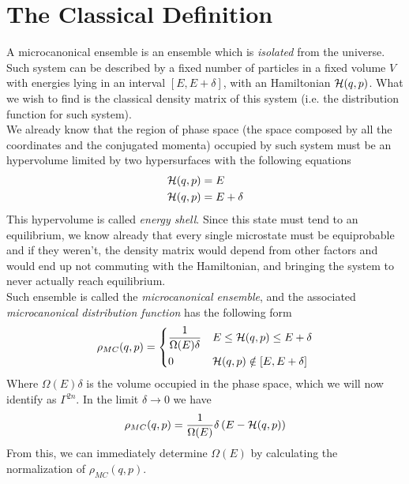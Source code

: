 \documentclass[../qm.tex]{subfiles}
\begin{document}
		\section{The Classical Definition}
		A microcanonical ensemble is an ensemble which is \textit{isolated} from the universe.\\
		Such system can be described by a fixed number of particles in a fixed volume $V$ with energies lying in an interval $[E,E+\delta]$, with an Hamiltonian $\mathcal{H}(q,p)$. What we wish to find is the classical density matrix of this system (i.e. the distribution function for such system).\\
		We already know that the region of phase space (the space composed by all the coordinates and the conjugated momenta) occupied by such system must be an hypervolume limited by two hypersurfaces with the following equations
		\begin{equation}
			\begin{aligned}
				\mathcal{H}(q,p)&=E\\
				\mathcal{H}(q,p)&=E+\delta
			\end{aligned}
			\label{eq:hypervolumeinphasespace}
		\end{equation}
		This hypervolume is called \textit{energy shell}. Since this state must tend to an equilibrium, we know already that every single microstate must be equiprobable and if they weren't, the density matrix would depend from other factors and would end up not commuting with the Hamiltonian, and bringing the system to never actually reach equilibrium.\\
		Such ensemble is called the \textit{microcanonical ensemble}, and the associated \textit{microcanonical distribution function} has the following form
		\begin{equation}
			\rho_{MC}(q,p)=\begin{dcases}
						\frac{1}{\Omega(E)\delta}&E\le\mathcal{H}(q,p)\le E+\delta\\
						0&\mathcal{H}(q,p)\notin[E,E+\delta]
					\end{dcases}
			\label{eq:microcanonicaldensity}
		\end{equation}
		Where $\Omega(E)\delta$ is the volume occupied in the phase space, which we will now identify as $\Gamma^{2n}$. In the limit $\delta\to0$ we have
		\begin{equation}
			\rho_{MC}(q,p)=\frac{1}{\Omega(E)}\delta\left( E-\mathcal{H}(q,p) \right)
			\label{eq:rhomclimitdelta}
		\end{equation}
		From this, we can immediately determine $\Omega(E)$ by calculating the normalization of $\rho_{MC}(q,p)$.
\end{document}

